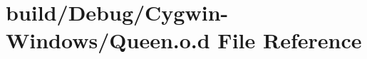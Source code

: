 \hypertarget{_cygwin-_windows_2_queen_8o_8d}{}\section{build/\+Debug/\+Cygwin-\/\+Windows/\+Queen.o.\+d File Reference}
\label{_cygwin-_windows_2_queen_8o_8d}
